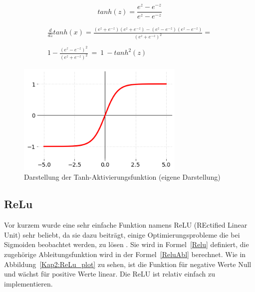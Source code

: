 \begin{equation} \label{Formel2_3}
    tanh(z) = \frac{e^{z}-e^{-z}}{e^{z}-e^{-z}}
\end{equation}
\label{TanhF}

\begin{equation} \label{TanhAbl}
    \begin{array}{ c }
        \frac{d}{dz} tanh( x) =\frac{\left( e^{z} +e^{-z}\right)\left( e^{z} +e^{-z}\right) -\left( e^{z} -e^{-z}\right)\left( e^{z} -e^{-z}\right)}{\left( e^{z} +e^{-z}\right)^{2}} = \\
        \\
        1-\frac{\left( e^{z} -e^{-z}\right)^{2}}{\left( e^{z} +e^{-z}\right)^{2}} \ =\ 1\ -tanh^{2}( z)
    \end{array}
\end{equation}
\label{TanhAbl}

\begin{figure}[H]
    \centering
    \includegraphics[width=8cm]{kapitel2/tanh_plot.png}
    \caption[Darstellung der Tanh-Aktivierungsfunktion]{Darstellung der Tanh-Aktivierungsfunktion (eigene Darstellung)}
    \label{Kap2:Tanh_plot}
\end{figure}

\subsection{ReLu}
Vor kurzem wurde eine sehr einfache Funktion namens ReLU (REctified Linear Unit) sehr beliebt, da sie dazu beiträgt, einige Optimierungsprobleme die bei Sigmoiden beobachtet werden, zu lösen \cite*[11]{AntonioGuili;AmitaKapoor;SujitPal2019}. Sie wird in Formel~\ref{Relu} definiert, die zugehörige Ableitungsfunktion wird in der Formel~\ref{ReluAbl} berechnet. Wie in Abbildung~\ref{Kap2:ReLu_plot} zu sehen, ist die Funktion für negative Werte Null und wächst für positive Werte linear. Die ReLU ist relativ einfach zu implementieren.

